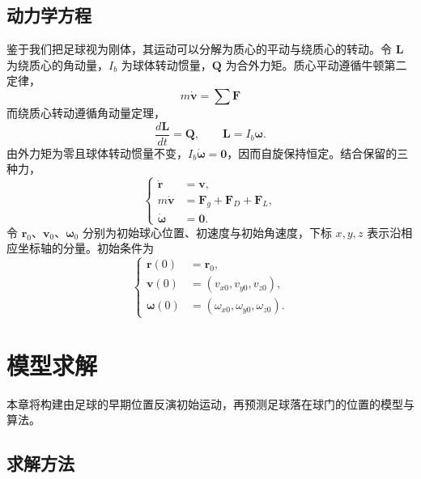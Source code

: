 \documentclass[12pt,letterpaper]{article}
\begin{document}
\subsection{动力学方程}\label{sec:dynamics}
鉴于我们把足球视为刚体，其运动可以分解为质心的平动与绕质心的转动。令 $\boldsymbol L$ 为绕质心的角动量，$I_b$ 为球体转动惯量，$\boldsymbol Q$ 为合外力矩。质心平动遵循牛顿第二定律，
\begin{equation}
  m\dot{\boldsymbol v} =\sum\boldsymbol F
\end{equation}
而绕质心转动遵循角动量定理，
\begin{equation}
\dfrac{d\boldsymbol L}{dt} =\boldsymbol Q,\qquad\boldsymbol L=I_b\boldsymbol\omega.
\end{equation}
由外力矩为零且球体转动惯量不变，$I_b\dot{\boldsymbol\omega}=\boldsymbol0$，因而自旋保持恒定。结合保留的三种力，
\begin{equation}
\left\{\begin{aligned}
\dot{\boldsymbol r}&=\boldsymbol v,\\
m\dot{\boldsymbol v}&=\boldsymbol F_g+\boldsymbol F_D+\boldsymbol F_L,\\
\dot{\boldsymbol\omega}&=\boldsymbol0.
\end{aligned}\right.\label{eq:motion}
\end{equation}
令 $\boldsymbol r_0$、$\boldsymbol v_0$、$\boldsymbol\omega_0$ 分别为初始球心位置、初速度与初始角速度，下标 $x,y,z$ 表示沿相应坐标轴的分量。初始条件为
\begin{equation}
\left\{\begin{aligned}
\boldsymbol r(0)&=\boldsymbol r_0,\\
\boldsymbol v(0)&=(v_{x0},v_{y0},v_{z0}),\\
\boldsymbol\omega(0)&=(\omega_{x0},\omega_{y0},\omega_{z0}).
\end{aligned}\right.\label{eq:initial}
\end{equation}

\section{模型求解}\label{sec:solving}
本章将构建由足球的早期位置反演初始运动，再预测足球落在球门的位置的模型与算法。

\subsection{求解方法}\label{sec:inverse}
\end{document}
